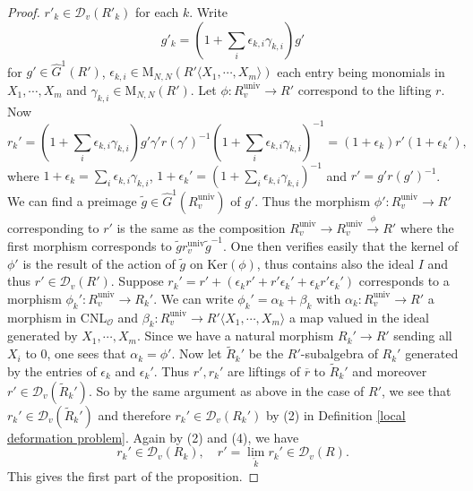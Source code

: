 \documentclass[12pt,oneside,reqno]{amsart}
\theoremstyle{plain}
\begin{document}
\begin{proof}
		$r'_k\in\mathcal{D}_v(R'_k)$
		for each $k$.
		Write
		\[
		g'_k=(1+\sum_i\epsilon_{k,i}\gamma_{k,i})g'
		\]
		for
		$g'\in\widehat{G}^1(R')$,
		$\epsilon_{k,i}\in
		\mathrm{M}_{N,N}
		(R'\langle X_1,\cdots,X_m\rangle)$
		each entry being monomials in
		$X_1,\cdots,X_m$
		and
		$\gamma_{k,i}
		\in
		\mathrm{M}_{N,N}
		(R')$.
		Let
		$\phi\colon
		R^\mathrm{univ}_v
		\rightarrow
		R'$
		correspond to the lifting
		$r$.
		Now
		\[
		r_k'
		=
		(1+\sum_i\epsilon_{k,i}\gamma_{k,i})
		g'\gamma'r(\gamma')^{-1}
		(1+\sum_i\epsilon_{k,i}\gamma_{k,i})^{-1}
		=
		(1+\epsilon_k)r'(1+\epsilon_k'),
		\]
		where
		$1+\epsilon_k
		=\sum_i\epsilon_{k,i}\gamma_{k,i}$,
		$1+\epsilon_k'
		=(1+\sum_i\epsilon_{k,i}\gamma_{k,i})^{-1}$
		and
		$r'=g'r(g')^{-1}$.
		We can find a preimage
		$\widetilde{g}\in
		\widehat{G}^1(R^\mathrm{univ}_v)$
		of $g'$.
		Thus the morphism
		$\phi'\colon
		R^\mathrm{univ}_v
		\rightarrow
		R'$
		corresponding to
		$r'$
		is the same as the
		composition
		$R^\mathrm{univ}_v
		\rightarrow
		R^\mathrm{univ}_v
		\xrightarrow{\phi}
		R'$
		where the first morphism corresponds to
		$\widetilde{g}r^\mathrm{univ}_v\widetilde{g}^{-1}$.
		One then verifies easily that
		the kernel of $\phi'$
		is the result of the action of
		$\widetilde{g}$ on
		$\mathrm{Ker}(\phi)$,
		thus contains also the ideal $I$
		and thus
		$r'\in
		\mathcal{D}_v(R')$.
		Suppose
		$r_k'=r'+(\epsilon_kr'+r'\epsilon_k'+
		\epsilon_kr'\epsilon_k')$
		corresponds to a morphism
		$\phi_k'
		\colon
		R^\mathrm{univ}_v
		\rightarrow
		R_k'$.
		We can write
		$\phi_k'=\alpha_k+\beta_k$
		with
		$\alpha_k
		\colon
		R^\mathrm{univ}_v
		\rightarrow
		R'$
		a morphism in $\mathrm{CNL}_\mathcal{O}$
		and
		$\beta_k
		\colon
		R^\mathrm{univ}_v
		\rightarrow
		R'\langle X_1,\cdots,X_m\rangle$
		a map valued in the ideal generated by
		$X_1,\cdots,X_m$.
		Since we have a natural morphism
		$R_k'\rightarrow R'$
		sending all $X_i$ to $0$,
		one sees that $\alpha_k=\phi'$.
		Now let
		$\widetilde{R}_k'$
		be the $R'$-subalgebra of
		$R_k'$ generated by the entries of
		$\epsilon_k$ and $\epsilon_k'$.
		Thus
		$r', r_k'$ are liftings of $\overline{r}$ to
		$\widetilde{R}_k'$ and moreover
		$r'\in\mathcal{D}_v(\widetilde{R}_k')$.
		So by the same argument as above in the case of
		$R'$,
		we see that
		$r_k'\in\mathcal{D}_v(\widetilde{R}_k')$
		and therefore
		$r_k'\in\mathcal{D}_v(R_k')$
		by (2) in Definition \ref{local deformation problem}.
		Again by (2) and (4),
		we have
		\[
		r_k'\in\mathcal{D}_v(R_k),
		\quad
		r'=\lim\limits_{\overleftarrow{k}}r_k'
		\in
		\mathcal{D}_v(R).
		\]
		This gives the first part of the proposition.
		

\end{proof}
\end{document}
